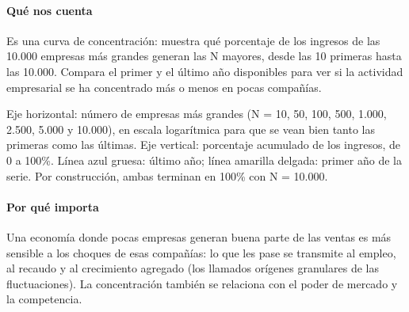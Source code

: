 \paragraph{Qué nos cuenta}
Es una curva de concentración: muestra qué porcentaje de los ingresos de las 10.000 empresas más grandes generan las N mayores, desde las 10 primeras hasta las 10.000. Compara el primer y el último año disponibles para ver si la actividad empresarial se ha concentrado más o menos en pocas compañías.

\begin{leer}
Eje horizontal: número de empresas más grandes (N = 10, 50, 100, 500, 1.000, 2.500, 5.000 y 10.000), en escala logarítmica para que se vean bien tanto las primeras como las últimas. Eje vertical: porcentaje acumulado de los ingresos, de 0 a 100\%. Línea azul gruesa: último año; línea amarilla delgada: primer año de la serie. Por construcción, ambas terminan en 100\% con N = 10.000.
\end{leer}

\paragraph{Por qué importa}
Una economía donde pocas empresas generan buena parte de las ventas es más sensible a los choques de esas compañías: lo que les pase se transmite al empleo, al recaudo y al crecimiento agregado (los llamados orígenes granulares de las fluctuaciones). La concentración también se relaciona con el poder de mercado y la competencia.

